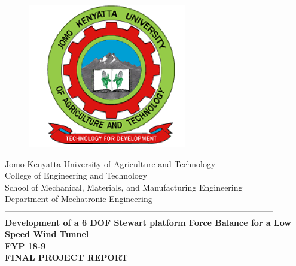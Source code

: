\documentclass[12pt,fleqn]{article}
\begin{document}
\begin{titlepage}
  \begin{center}
    \vspace*{-4.0cm}
    \begin{figure}[!h]
      \centering
      \includegraphics[width=0.3\linewidth]{Figures/JKUAT_logo}
      \label{fig:jomologo}
    \end{figure}
    \large{Jomo Kenyatta University of Agriculture and Technology}\\
    \large{College of Engineering and Technology}\\
    \large{School of Mechanical, Materials, and Manufacturing Engineering}\\
    \large{Department of Mechatronic Engineering}\\

    ------------------------------------------------------------------------------------------------\\[0.1cm]
    \vspace{0.1cm}
    \LARGE{\textbf{Development of a 6 DOF Stewart platform
        Force Balance for a Low Speed Wind Tunnel}}\\
    \vspace{0.2cm}
    \LARGE{\large\textbf{FYP 18-9
      }}\\
    {\large\textbf{FINAL PROJECT REPORT
    }}\\[0.1cm]


\end{center}
\end{titlepage}
\end{document}
